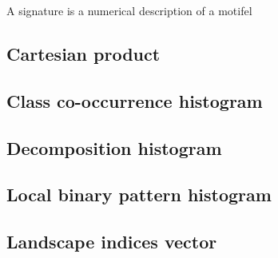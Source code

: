 A signature is a numerical description of a motifel

\subsection{Cartesian product}

\subsection{Class co-occurrence histogram}

\subsection{Decomposition histogram}

\subsection{Local binary pattern histogram}

\subsection{Landscape indices vector}
